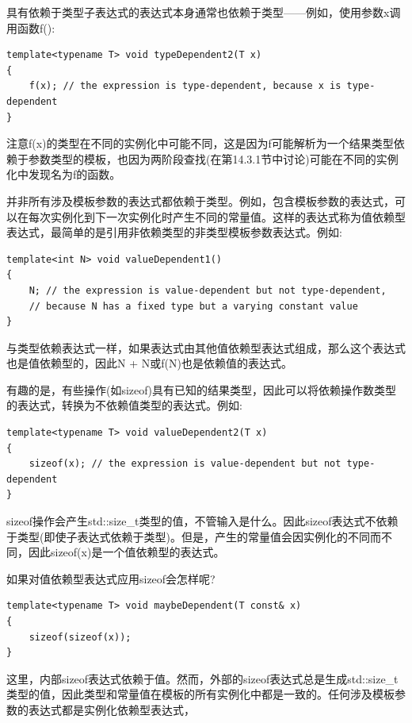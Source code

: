 具有依赖于类型子表达式的表达式本身通常也依赖于类型——例如，使用参数x调用函数f():

\begin{lstlisting}[style=styleCXX]
template<typename T> void typeDependent2(T x)
{
	f(x); // the expression is type-dependent, because x is type-dependent
}
\end{lstlisting}

注意f(x)的类型在不同的实例化中可能不同，这是因为f可能解析为一个结果类型依赖于参数类型的模板，也因为两阶段查找(在第14.3.1节中讨论)可能在不同的实例化中发现名为f的函数。

并非所有涉及模板参数的表达式都依赖于类型。例如，包含模板参数的表达式，可以在每次实例化到下一次实例化时产生不同的常量值。这样的表达式称为值依赖型表达式，最简单的是引用非依赖类型的非类型模板参数表达式。例如:

\begin{lstlisting}[style=styleCXX]
template<int N> void valueDependent1()
{
	N; // the expression is value-dependent but not type-dependent,
	// because N has a fixed type but a varying constant value
}
\end{lstlisting}

与类型依赖表达式一样，如果表达式由其他值依赖型表达式组成，那么这个表达式也是值依赖型的，因此N + N或f(N)也是依赖值的表达式。

有趣的是，有些操作(如sizeof)具有已知的结果类型，因此可以将依赖操作数类型的表达式，转换为不依赖值类型的表达式。例如:

\begin{lstlisting}[style=styleCXX]
template<typename T> void valueDependent2(T x)
{
	sizeof(x); // the expression is value-dependent but not type-dependent
}
\end{lstlisting}

sizeof操作会产生std::size\_t类型的值，不管输入是什么。因此sizeof表达式不依赖于类型(即使子表达式依赖于类型)。但是，产生的常量值会因实例化的不同而不同，因此sizeof(x)是一个值依赖型的表达式。

如果对值依赖型表达式应用sizeof会怎样呢?

\begin{lstlisting}[style=styleCXX]
template<typename T> void maybeDependent(T const& x)
{
	sizeof(sizeof(x));
}
\end{lstlisting}

这里，内部sizeof表达式依赖于值。然而，外部的sizeof表达式总是生成std::size\_t类型的值，因此类型和常量值在模板的所有实例化中都是一致的。任何涉及模板参数的表达式都是实例化依赖型表达式，

